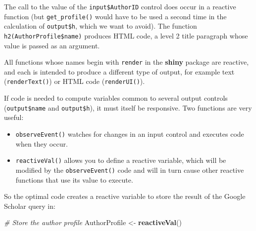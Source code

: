 \documentclass[
  12pt,
  american,
  a4paper,
  extrafontsizes,onecolumn,openright
  ]{memoir}
\newenvironment{Shaded}{\begin{snugshade}}{\end{snugshade}}
\newcommand{\CommentTok}[1]{\textcolor[rgb]{0.56,0.35,0.01}{\textit{#1}}}
\newcommand{\FunctionTok}[1]{\textcolor[rgb]{0.13,0.29,0.53}{\textbf{#1}}}
\newcommand{\NormalTok}[1]{#1}
\newcommand{\OtherTok}[1]{\textcolor[rgb]{0.56,0.35,0.01}{#1}}
\newcommand{\SpecialCharTok}[1]{\textcolor[rgb]{0.81,0.36,0.00}{\textbf{#1}}}
\providecommand{\tightlist}{%
  \setlength{\itemsep}{0pt}\setlength{\parskip}{0pt}}
\begin{document}
\begin{Shaded}
\end{Shaded}

\normalsize

The call to the value of the \texttt{input\$AuthorID} control does occur in a reactive function (but \texttt{get\_profile()} would have to be used a second time in the calculation of \texttt{output\$h}, which we want to avoid).
The function \texttt{h2(AuthorProfile\$name)} produces HTML code, a level 2 title paragraph whose value is passed as an argument.

All functions whose names begin with \texttt{render} in the \textbf{shiny} package are reactive, and each is intended to produce a different type of output, for example text (\texttt{renderText()}) or HTML code (\texttt{renderUI()}).

If code is needed to compute variables common to several output controls (\texttt{output\$name} and \texttt{output\$h}), it must itself be responsive.
Two functions are very useful:

\begin{itemize}
\tightlist
\item
  \texttt{observeEvent()} watches for changes in an input control and executes code when they occur.
\item
  \texttt{reactiveVal()} allows you to define a reactive variable, which will be modified by the \texttt{observeEvent()} code and will in turn cause other reactive functions that use its value to execute.
\end{itemize}

So the optimal code creates a reactive variable to store the result of the Google Scholar query in:

\scriptsize

\begin{Shaded}
\begin{Highlighting}[]
  \CommentTok{\# Store the author profile}
\NormalTok{  AuthorProfile }\OtherTok{\textless{}{-}} \FunctionTok{reactiveVal}\NormalTok{()}
\end{Highlighting}
\end{Shaded}
\end{document}
